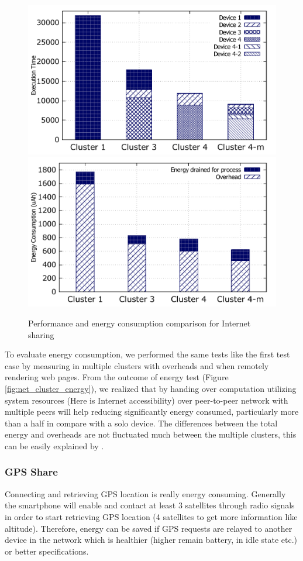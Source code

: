 \documentclass[conference]{IEEEtran}
\begin{document}
\begin{figure}
	\centering
		\includegraphics[width=.45\textwidth]{data/net_perf_01.pdf}
		\includegraphics[width=.45\textwidth]{data/net_energy.pdf}
	\caption{Performance and energy consumption comparison for Internet sharing}
	\label{fig:net_clusters_perf}
\end{figure}

To evaluate energy consumption, we performed the same tests like the first test case by measuring in multiple clusters with overheads and when remotely rendering web pages. From the outcome of energy test (Figure \ref{fig:net_cluster_energy}), we realized that by handing over computation utilizing system resources (Here is Internet accessibility) over peer-to-peer network with multiple peers will help reducing significantly energy consumed, particularly more than a half in compare with a solo device. The differences between the total energy and overheads are not fluctuated much between the multiple clusters, this can be easily explained by \cite{wifi_energy}.\\


\subsubsection{GPS Share}
Connecting and retrieving GPS location is really energy consuming. Generally the smartphone will enable and contact at least 3 satellites through radio signals in order to start retrieving GPS location (4 satellites to get more information like altitude). Therefore, energy can be saved if GPS requests are relayed to another device in the network which is healthier (higher remain battery, in idle state etc.) or better specifications.
\end{document}
